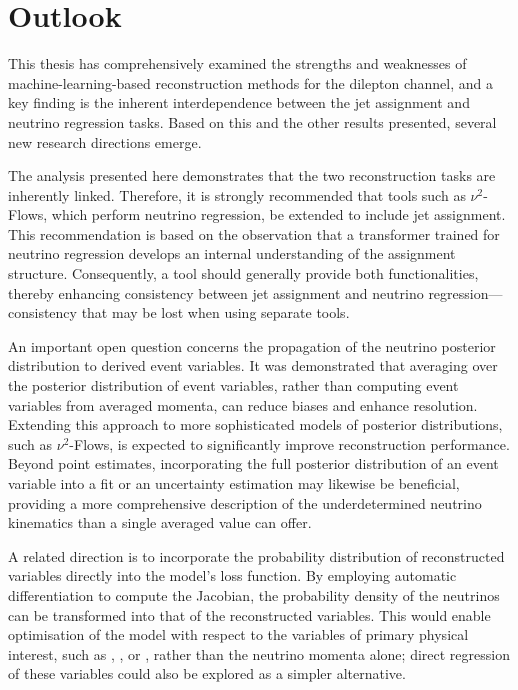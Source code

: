 \section{Outlook}
\label{sec:outlook}
This thesis has comprehensively examined the strengths and weaknesses of machine-learning-based reconstruction methods for the dilepton channel, and a key finding is the inherent interdependence between the jet assignment and neutrino regression tasks. Based on this and the other results presented, several new research directions emerge.

The analysis presented here demonstrates that the two reconstruction tasks are inherently linked. Therefore, it is strongly recommended that tools such as $\nu^2$-Flows, which perform neutrino regression, be extended to include jet assignment. This recommendation is based on the observation that a transformer trained for neutrino regression develops an internal understanding of the assignment structure. Consequently, a tool should generally provide both functionalities, thereby enhancing consistency between jet assignment and neutrino regression—consistency that may be lost when using separate tools.

An important open question concerns the propagation of the neutrino posterior distribution to derived event variables. It was demonstrated that averaging over the posterior distribution of event variables, rather than computing event variables from averaged momenta, can reduce biases and enhance resolution. Extending this approach to more sophisticated models of posterior distributions, such as $\nu^2$-Flows, is expected to significantly improve reconstruction performance. Beyond point estimates, incorporating the full posterior distribution of an event variable into a fit or an uncertainty estimation may likewise be beneficial, providing a more comprehensive description of the underdetermined neutrino kinematics than a single averaged value can offer.

A related direction is to incorporate the probability distribution of reconstructed variables directly into the model's loss function. By employing automatic differentiation to compute the Jacobian, the probability density of the neutrinos can be transformed into that of the reconstructed variables. This would enable optimisation of the model with respect to the variables of primary physical interest, such as \mttbar, \chel, or \chan, rather than the neutrino momenta alone; direct regression of these variables could also be explored as a simpler alternative.

